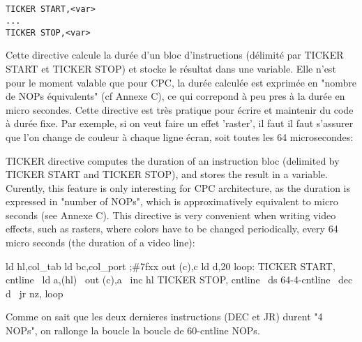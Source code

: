 \subsection{}


\subsection{}


\subsection{}



\begin{verbatim}
TICKER START,<var>
...
TICKER STOP,<var>
\end{verbatim}

\begin{xfr}
Cette directive calcule la durée d'un bloc d'instructions (délimité par TICKER START et TICKER STOP) et stocke le résultat dans une variable. Elle n'est pour le moment valable que pour CPC, la durée calculée est exprimée en "nombre de NOPs équivalents" (cf Annexe C), ce qui correpond à peu pres à la durée en micro secondes. Cette directive est très pratique pour écrire et maintenir du code à durée fixe. Par exemple, si on veut faire un effet 'raster', il faut il faut s'assurer que l'on change de couleur à chaque ligne écran, soit toutes les 64 microsecondes:
\end{xfr}
\begin{xen}
TICKER directive computes the duration of an instruction bloc (delimited by TICKER START and TICKER STOP), and stores the result in a variable. Curently, this feature is only interesting for CPC architecture, as the duration is expressed in "number of NOPs", which is approximatively equivalent to micro seconds (see Annexe C). This directive is very convenient when writing video effects, such as rasters, where colors have to be changed periodically, every 64 micro seconds (the duration of a video line):
\end{xen}

\begin{code}
ld hl,col\_tab
ld bc,col\_port  ;\#7fxx
out (c),c
ld d,20
loop:
TICKER START, cntline
\ ld a,(hl)
\ out (c),a
\ inc hl
TICKER STOP, cntline
\ ds 64-4-cntline
\ dec d
\	jr nz, loop
\end{code}

\begin{xfr}
Comme on sait que les deux dernieres instructions (DEC et JR) durent "4 NOPs",
on rallonge la boucle la boucle de 60-cntline NOPs.
\end{xfr}
